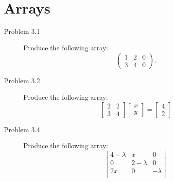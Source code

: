 \documentclass{article}
\begin{document}
\section{Arrays}
\begin{description}
    \item[Problem 3.1] Produce the following array:\\
    \[
    \left(
    \begin{array}{cc|c}
        1 & 2 & 0\\
        3 & 4 & 0
    \end{array}
    \right).
    \]
    \item[Problem 3.2] Produce the following array:\\
    \[
    \left[
    \begin{array}{cc}
        2 &  2\\
        3 &  4
    \end{array}
    \right]
    \left[
    \begin{array}{c}
    x\\y
    \end{array}
    \right]
    =
    \left[
    \begin{array}{c}
    4\\2
    \end{array}
    \right]
    \]
    \item[Problem 3.4] Produce the following array:\\
    \[\left|
    \begin{array}{ccc}
        4-\lambda & x & 0  \\
        0 & 2-\lambda & 0\\
        2x & 0 & -\lambda\\
    \end{array}
    \right|\]
\end{description}
\newpage
\end{document}
